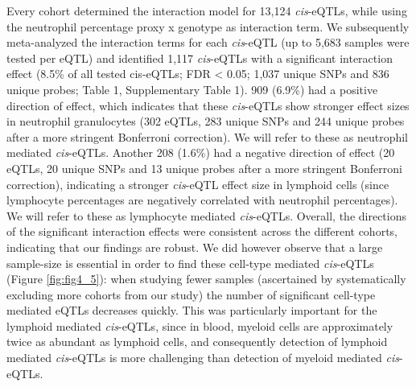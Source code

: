   Every cohort determined the interaction model for 13,124 \emph{cis}-eQTLs, while using the neutrophil 
  percentage proxy x genotype as interaction term. We subsequently meta-analyzed the interaction 
  terms for each \emph{cis}-eQTL (up to 5,683 samples were tested per eQTL) and identified 1,117 \emph{cis}-eQTLs 
  with a significant interaction effect (8.5\% of all tested cis-eQTLs; FDR < 0.05; 1,037 unique SNPs 
  and 836 unique probes; Table 1, Supplementary Table 1). 909 (6.9\%) had a positive direction of 
  effect, which indicates that these \emph{cis}-eQTLs show stronger effect sizes in neutrophil granulocytes 
  (302 eQTLs, 283 unique SNPs and 244 unique probes after a more stringent Bonferroni correction). We 
  will refer to these as neutrophil mediated \emph{cis}-eQTLs. Another 208 (1.6\%) had a negative direction of 
  effect (20 eQTLs, 20 unique SNPs and 13 unique probes after a more stringent Bonferroni correction), 
  indicating a stronger \emph{cis}-eQTL effect size in lymphoid cells (since lymphocyte percentages are 
  negatively correlated with neutrophil percentages). We will refer to these 
  as lymphocyte mediated \emph{cis}-eQTLs. Overall, the directions of the significant interaction effects were 
  consistent across the different cohorts, indicating that our findings are robust. We did however observe 
  that a large sample-size is essential in order to find these 
  cell-type mediated \emph{cis}-eQTLs (Figure \ref{fig:fig4_5}): when studying fewer samples (ascertained by systematically 
  excluding more cohorts from our study) the number of significant cell-type mediated eQTLs decreases 
  quickly. This was particularly important for the lymphoid mediated \emph{cis}-eQTLs, since in blood, 
  myeloid cells are approximately twice as abundant as lymphoid cells, and consequently detection of 
  lymphoid mediated \emph{cis}-eQTLs is more challenging than detection of myeloid mediated \emph{cis}-eQTLs.

